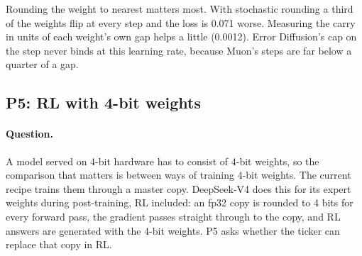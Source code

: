 \documentclass[11pt]{article}
\begin{document}
Rounding the weight to nearest matters most. With stochastic rounding a third of the weights flip at every step and
the loss is 0.071 worse. Measuring the carry in units of each weight's own gap helps a little (0.0012). Error
Diffusion's cap on the step never binds at this learning rate, because Muon's steps are far below a quarter of a gap.

\subsection{P5: RL with 4-bit weights}\label{sec:p5}
\paragraph{Question.} A model served on 4-bit hardware has to consist of 4-bit weights, so the comparison that matters
is between ways of training 4-bit weights. The current recipe trains them through a master copy. DeepSeek-V4
\citep{deepseek2026v4} does this for its expert weights during post-training, RL included: an fp32 copy is rounded to
4 bits for every forward pass, the gradient passes straight through to the copy, and RL answers are generated with the
4-bit weights. P5 asks whether the ticker can replace that copy in RL.
\end{document}
